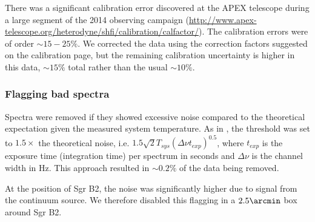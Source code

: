 There was a significant calibration error discovered at the APEX telescope during
a large segment of the 2014 observing campaign
(\url{http://www.apex-telescope.org/heterodyne/shfi/calibration/calfactor/}).
The calibration errors were of order $\sim15-25\%$.  We corrected the data using
the correction factors suggested on the calibration page, but the remaining
calibration uncertainty is higher in this data, $\sim15\%$ total rather than
the usual $\sim10\%$.

\subsubsection{Flagging bad spectra}
\label{sec:flagging}
Spectra were removed if they showed excessive noise compared to the
theoretical expectation given the measured system temperature.  As in
\citet{Ao2013a}, the threshold was set to $1.5\times$ the theoretical noise,
i.e. $1.5 \sqrt{2} T_{sys} (\Delta\nu t_{exp})^{0.5}$, where $t_{exp}$ is the
exposure time (integration time) per spectrum in seconds and $\Delta\nu$ is the
channel width in Hz.  This approach resulted in $\sim0.2\%$ of the data being
removed.  

At the position of Sgr B2, the noise was significantly higher due to signal
from the continuum source.  We therefore disabled this flagging in a
$2.5\arcmin$ box around Sgr B2.



